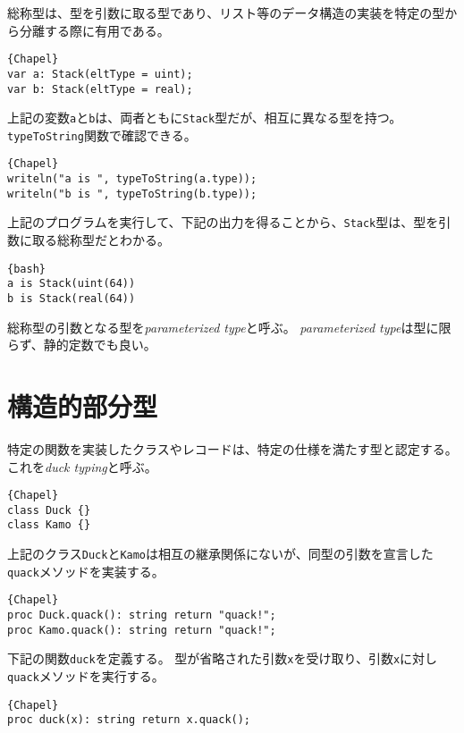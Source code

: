 \documentclass[10pt,a4paper]{book}
\begin{document}
総称型は、型を引数に取る型であり、リスト等のデータ構造の実装を特定の型から分離する際に有用である。

\begin{Verbatim}{Chapel}
var a: Stack(eltType = uint);
var b: Stack(eltType = real);
\end{Verbatim}

上記の変数\verb#a#と\verb#b#は、両者ともに\verb#Stack#型だが、相互に異なる型を持つ。
\verb#typeToString#関数で確認できる。

\begin{Verbatim}{Chapel}
writeln("a is ", typeToString(a.type));
writeln("b is ", typeToString(b.type));
\end{Verbatim}

上記のプログラムを実行して、下記の出力を得ることから、\verb#Stack#型は、型を引数に取る総称型だとわかる。

\begin{Verbatim}{bash}
a is Stack(uint(64))
b is Stack(real(64))
\end{Verbatim}

総称型の引数となる型を\textit{parameterized type}と呼ぶ。
\textit{parameterized type}は型に限らず、静的定数でも良い。

\section{構造的部分型}

特定の関数を実装したクラスやレコードは、特定の仕様を満たす型と認定する。
これを\textit{duck typing}と呼ぶ。

\begin{Verbatim}{Chapel}
class Duck {}
class Kamo {}
\end{Verbatim}

上記のクラス\verb#Duck#と\verb#Kamo#は相互の継承関係にないが、同型の引数を宣言した\verb#quack#メソッドを実装する。

\begin{Verbatim}{Chapel}
proc Duck.quack(): string return "quack!";
proc Kamo.quack(): string return "quack!";
\end{Verbatim}

下記の関数\verb#duck#を定義する。
型が省略された引数\verb#x#を受け取り、引数\verb#x#に対し\verb#quack#メソッドを実行する。

\begin{Verbatim}{Chapel}
proc duck(x): string return x.quack();
\end{Verbatim}
\end{document}
